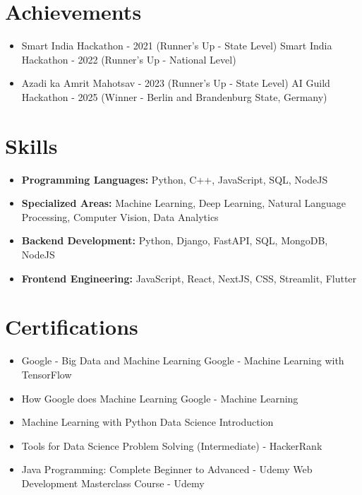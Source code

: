 \documentclass[a4paper,10pt]{article}
\begin{document}
\section*{Achievements}
\begin{itemize}
\item Smart India Hackathon - 2021 (Runner's Up - State Level) \hfill Smart India Hackathon - 2022 (Runner's Up - National Level)
\item Azadi ka Amrit Mahotsav - 2023 (Runner's Up - State Level) \hfill AI Guild Hackathon - 2025 (Winner - Berlin and Brandenburg State, Germany)
\end{itemize}

\section*{Skills}
\begin{itemize}
  \item \textbf{Programming Languages:} Python, C++, JavaScript, SQL, NodeJS
  \item \textbf{Specialized Areas:} Machine Learning, Deep Learning, Natural Language Processing, Computer Vision, Data Analytics
  \item \textbf{Backend Development:} Python, Django, FastAPI, SQL, MongoDB, NodeJS
  \item \textbf{Frontend Engineering:} JavaScript, React, NextJS, CSS, Streamlit, Flutter
\end{itemize}

\section*{Certifications}
\begin{itemize}
\item Google - Big Data and Machine Learning \hfill Google - Machine Learning with TensorFlow
\item How Google does Machine Learning \hfill Google - Machine Learning
\item Machine Learning with Python \hfill Data Science Introduction
\item Tools for Data Science \hfill Problem Solving (Intermediate) - HackerRank
\item Java Programming: Complete Beginner to Advanced - Udemy \hfill Web Development Masterclass Course - Udemy
\end{itemize}
\end{document}

